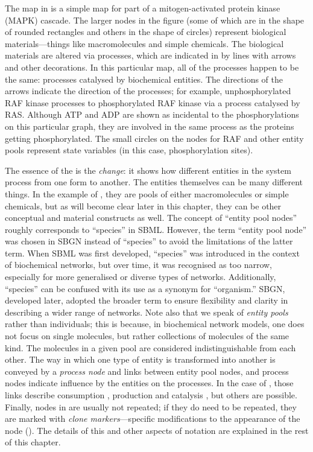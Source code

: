 The map in  is a simple map for part of a mitogen-activated protein kinase (MAPK) cascade.  The larger nodes in the figure (some of which are in the shape of rounded rectangles and others in the shape of circles) represent biological materials---things like macromolecules and simple chemicals.  The biological materials are altered via processes, which are indicated in \PDl by lines with arrows and other decorations.  In this particular map, all of the processes happen to be the same: processes catalysed by biochemical entities.  The directions of the arrows indicate the direction of the processes; for example, unphosphorylated RAF kinase processes to phosphorylated RAF kinase via a process catalysed by RAS. Although ATP and ADP are shown as incidental to the phosphorylations on this particular graph, they are involved in the same process as the proteins getting phosphorylated. The small circles on the nodes for RAF and other entity pools represent state variables (in this case, phosphorylation sites). 

The essence of the \PDs is the \emph{change}: it shows how different entities in the system process from one form to another.  The entities themselves can be many different things.  In the example of , they are pools of either macromolecules or simple chemicals, but as will become clear later in this chapter, they can be other conceptual and material constructs as well. The concept of ``entity pool nodes'' roughly corresponds to ``species'' in SBML. However, the term ``entity pool node'' was chosen in SBGN instead of ``species'' to avoid the limitations of the latter term. When SBML was first developed, ``species'' was introduced in the context of biochemical networks, but over time, it was recognised as too narrow, especially for more generalised or diverse types of networks. Additionally, ``species'' can be confused with its use as a synonym for ``organism.'' SBGN, developed later, adopted the broader term to ensure flexibility and clarity in describing a wider range of networks. Note also that we speak of \emph{entity pools} rather than individuals; this is because, in biochemical network models, one does not focus on single molecules, but rather collections of molecules of the same kind.  The molecules in a given pool are considered indistinguishable from each other.  The way in which one type of entity is transformed into another is conveyed by a \emph{process node} and links between entity pool nodes, and process nodes indicate influence by the entities on the processes.  In the case of , those links describe consumption , production  and catalysis , but others are possible.  Finally, nodes in \PDs are usually not repeated; if they do need to be repeated, they are marked with \emph{clone markers}---specific modifications to the appearance of the node (). The details of this and other aspects of \PD notation are explained in the rest of this chapter.

